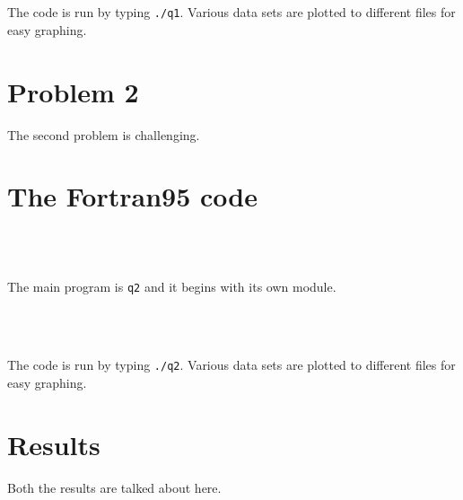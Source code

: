 \documentclass[12pt]{article}
\begin{document}
\begin{lstlisting}[frame=single,caption={{\tt q1.f95}},label=adpend]



\end{lstlisting}


The code is run by typing {\tt ./q1}. Various data sets are plotted to different files for easy graphing.

\section{Problem 2}
The second problem is challenging.


\section{The Fortran95 code}

\begin{lstlisting}[frame=single,caption={ {\tt q2.f95}},label=module]



\end{lstlisting}

The main program is {\tt q2} and it begins with its own module. 

\begin{lstlisting}[frame=single,caption={{\tt q2.f95}},label=adpend]



\end{lstlisting}


The code is run by typing {\tt ./q2}. Various data sets are plotted to different files for easy graphing.


\section{Results}

Both the results are talked about here. 
\end{document}
